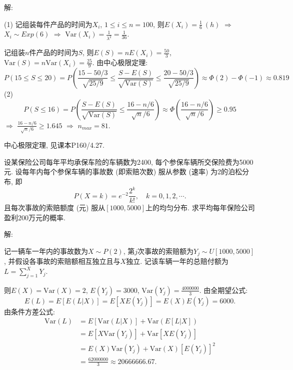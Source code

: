 \documentclass[standard]{ExBook}
\renewenvironment{shaded}{%
  \def\FrameCommand{\fboxsep=\FrameSep \colorbox{shadecolor}}%
  \MakeFramed{\advance\hsize-\width \FrameRestore}%
}{%
  \endMakeFramed
}
\begin{document}
\begin{qitems}
解: 

(1) 记组装每件产品的时间为$X_i$, $1\leq i\leq n=100$, 则$E(X_i)=\displaystyle \frac{1}{6}\ (h)$ $\Longrightarrow$ $X_i\sim Exp(6)$ $\Longrightarrow$ $\mathrm{Var}(X_i)=\displaystyle\frac{1}{\lambda^2}=\displaystyle\frac{1}{36}$.

记组装$n$件产品的时间为$S$, 则$\displaystyle E(S)=nE(X_i)=\frac{50}{3}$, $\displaystyle \mathrm{Var}(S)=n\mathrm{Var}(X_i)=\frac{25}{9}$. 由中心极限定理:
$$\displaystyle P(15\leq S\leq 20)=P\left(\frac{15-50/3}{\sqrt{25/9}} \leq \frac{S-E(S)}{\sqrt{\mathrm{Var}(S)}} \leq \frac{20-50/3}{\sqrt{25/9}}\right) \approx \Phi(2)-\Phi(-1) \approx 0.819$$
(2)
$$\displaystyle P(S\leq 16)=P\left(\frac{S-E(S)}{\sqrt{\mathrm{Var}(S)}} \leq \frac{16-n/6}{\sqrt{n}/6}\right) \approx \Phi\left(\frac{16-n/6}{\sqrt{n}/6}\right) \geq 0.95$$
$\Longrightarrow$ $\displaystyle \frac{16-n/6}{\sqrt{n}/6} \geq 1.645$ $\Longrightarrow$ $n_{max}=81$.

\textcolor{themeColor}{\selectfont {} 中心极限定理, 见课本P160/4.27.}

\vspace{2.5cm-5em}

    \begin{bbox}
    \begin{shaded}
        \qitem
设某保险公司每年平均承保车险的车辆数为2400, 每个参保车辆所交保险费为5000元. 设每年内每个参保车辆的事故数 (即索赔次数) 服从参数 (速率) 为2的泊松分布, 即
$$P(X=k)=\displaystyle e^{-2}\frac{2^k}{k!},\quad k=0,1,2,\cdots.$$
且每次事故的索赔额度 (元) 服从$[1000,5000]$上的均匀分布. 求平均每年保险公司盈利200万元的概率.
    \end{shaded}
    \end{bbox}

\vspace{\dimexpr2.5cm-5em\relax}

解:

记一辆车一年内的事故数为$X\sim P(2)$, 第$j$次事故的索赔额为$Y_j\sim U[1000,5000]$, 并假设各事故的索赔额相互独立且与$X$独立. 记该车辆一年的总赔付额为$L=\sum\limits_{j=1}^{X}Y_j$.

则$E(X)=\mathrm{Var}(X)=2$, $E(Y_j)=3000$, $\mathrm{Var}(Y_j)=\displaystyle\frac{4000000}{3}$. 由全期望公式:
$$
E(L)=E[E(L|X)]=E[XE(Y_j)]=E(X)E(Y_j)=6000.
$$
由条件方差公式:
$$
\begin{aligned}
\mathrm{Var}(L)
&=E[\mathrm{Var}(L|X)]+\mathrm{Var}(E[L|X])\\
&=E[X\mathrm{Var}(Y_j)]+\mathrm{Var}[XE(Y_j)]\\
&=E(X)\mathrm{Var}(Y_j)+\mathrm{Var}(X)[E(Y_j)]^2\\
&=\frac{62000000}{3}\approx20666666.67.
\end{aligned}
$$


\end{qitems}
\end{document}
